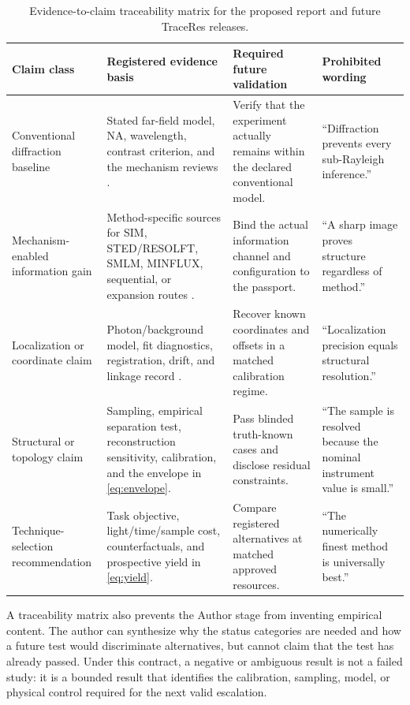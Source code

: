 \documentclass[conference]{IEEEtran}
\begin{document}
\begin{table}[t]
\caption{Evidence-to-claim traceability matrix for the proposed report and future TraceRes releases.}
\label{tab:traceability}
\centering
\footnotesize
\setlength{\tabcolsep}{3pt}
\begin{tabular}{p{} p{} p{} p{}}
\hline
\textbf{Claim class} & \textbf{Registered evidence basis} & \textbf{Required future validation} & \textbf{Prohibited wording}\\
\hline
Conventional diffraction baseline & Stated far-field model, NA, wavelength, contrast criterion, and the mechanism reviews \cite{hell2015,huang2010}. & Verify that the experiment actually remains within the declared conventional model. & ``Diffraction prevents every sub-Rayleigh inference.''\\
Mechanism-enabled information gain & Method-specific sources for SIM, STED/RESOLFT, SMLM, MINFLUX, sequential, or expansion routes \cite{wegel2016,lelek2021,schmidt2021,zwettler2020}. & Bind the actual information channel and configuration to the passport. & ``A sharp image proves structure regardless of method.''\\
Localization or coordinate claim & Photon/background model, fit diagnostics, registration, drift, and linkage record \cite{baddeley2018,lelek2021}. & Recover known coordinates and offsets in a matched calibration regime. & ``Localization precision equals structural resolution.''\\
Structural or topology claim & Sampling, empirical separation test, reconstruction sensitivity, calibration, and the envelope in \eqref{eq:envelope}. & Pass blinded truth-known cases and disclose residual constraints. & ``The sample is resolved because the nominal instrument value is small.''\\
Technique-selection recommendation & Task objective, light/time/sample cost, counterfactuals, and prospective yield in \eqref{eq:yield}. & Compare registered alternatives at matched approved resources. & ``The numerically finest method is universally best.''\\
\hline
\end{tabular}
\end{table}

A traceability matrix also prevents the Author stage from inventing empirical content. The author can synthesize why the status categories are needed and how a future test would discriminate alternatives, but cannot claim that the test has already passed. Under this contract, a negative or ambiguous result is not a failed study: it is a bounded result that identifies the calibration, sampling, model, or physical control required for the next valid escalation.
\end{document}
